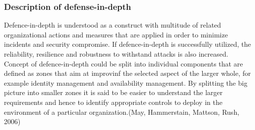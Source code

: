 \documentclass{article}
\begin{document}
\subsubsection{Description of defense-in-depth}
Defence-in-depth is understood as a construct with multitude of related organizational actions and measures that are applied in order to minimize incidents and security compromise. If defence-in-depth is successfully utilized, the reliability, resilience and robustness to withstand attacks is also increased. Concept of defence-in-depth could be split into individual components that are defined as zones that aim at improvinf the selected aspect of the larger whole, for example identity management and availability management. By splitting the big picture into smaller zones it is said to be easier to understand the larger requirements and hence to identify appropriate controls to deploy in the environment of a particular organization.(May, Hammerstain, Mattson, Rush, 2006)
\end{document}

